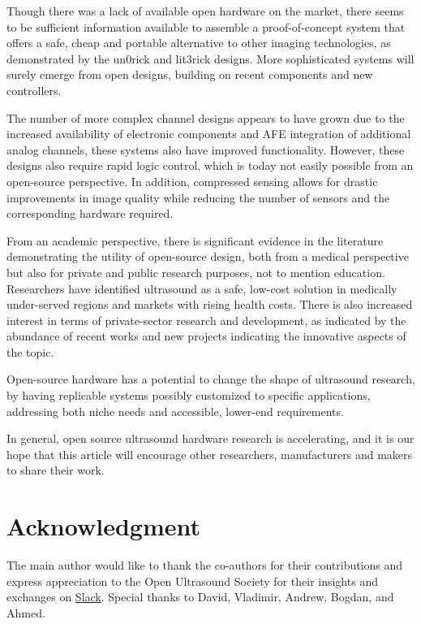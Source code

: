 \documentclass{article}
\begin{document}
Though there was a lack of available open hardware on the market, there seems to be sufficient information available to assemble a proof-of-concept system that offers a safe, cheap and portable alternative to other imaging technologies, as demonstrated by the un0rick and lit3rick designs. More sophisticated systems will surely emerge from open designs, building on recent components and new controllers.

The number of more complex channel designs appears to have grown due to the increased availability of electronic components and AFE integration of additional analog channels, these systems also have improved functionality. However, these designs also require rapid logic control, which is today not easily possible from an open-source perspective. In addition, compressed sensing allows for drastic improvements in image quality while reducing the number of sensors and the corresponding hardware required. 

From an academic perspective, there is significant evidence in the literature demonstrating the utility of open-source design, both from a medical perspective but also for private and public research purposes, not to mention education. Researchers have identified ultrasound as a safe, low-cost solution in medically under-served regions and markets with rising health costs. There is also increased interest in terms of private-sector research and development, as indicated by the abundance of recent works and new projects indicating the innovative aspects of the topic. 

Open-source hardware has a potential to change the shape of ultrasound research, by having replicable systems possibly customized to specific applications, addressing both niche needs and accessible, lower-end requirements.



In general, open source ultrasound hardware research \cite{roman_open-source_2019} is accelerating, and it is our hope that this article will encourage other researchers, manufacturers \cite{yu_direct_2020} and makers to share their work. 

\section*{Acknowledgment}

The main author would like to thank the co-authors for their contributions and express appreciation to the Open Ultrasound Society for their insights and exchanges on \href{https://join.slack.com/t/usdevkit/shared_invite/zt-2g501obl-z53YHyGOOMZjeCXuXzjZow}{Slack}. Special thanks to David, Vladimir, Andrew, Bogdan, and Ahmed.

\clearpage



\clearpage



  
\end{document}
